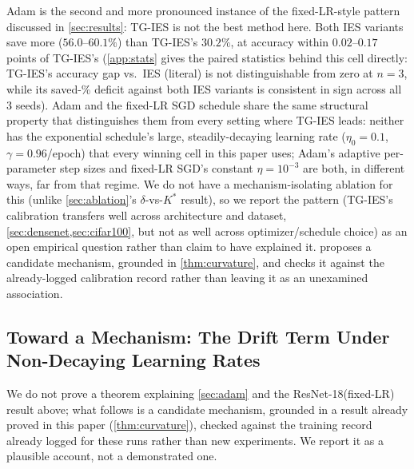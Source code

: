 \documentclass{article}
\theoremstyle{plain}
\theoremstyle{definition}
\theoremstyle{remark}
\begin{document}
Adam \citep{kingma2015adam} is the second and more pronounced instance of the fixed-LR-style pattern discussed in \cref{sec:results}: TG-IES is not the best method here. Both IES variants save more ($56.0$--$60.1\%$) than TG-IES's $30.2\%$, at accuracy within $0.02$--$0.17$ points of TG-IES's (\cref{app:stats} gives the paired statistics behind this cell directly: TG-IES's accuracy gap vs.\ IES (literal) is not distinguishable from zero at $n=3$, while its saved-\% deficit against both IES variants is consistent in sign across all 3 seeds). Adam and the fixed-LR SGD schedule share the same structural property that distinguishes them from every setting where TG-IES leads: neither has the exponential schedule's large, steadily-decaying learning rate ($\eta_0{=}0.1$, $\gamma{=}0.96$/epoch) that every winning cell in this paper uses; Adam's adaptive per-parameter step sizes and fixed-LR SGD's constant $\eta{=}10^{-3}$ are both, in different ways, far from that regime. We do not have a mechanism-isolating ablation for this (unlike \cref{sec:ablation}'s $\delta$-vs-$K^*$ result), so we report the pattern (TG-IES's calibration transfers well across architecture and dataset, \cref{sec:densenet,sec:cifar100}, but not as well across optimizer/schedule choice) as an open empirical question rather than claim to have explained it.  proposes a candidate mechanism, grounded in \cref{thm:curvature}, and checks it against the already-logged calibration record rather than leaving it as an unexamined association.

\subsection{Toward a Mechanism: The Drift Term Under Non-Decaying Learning Rates}
\label{sec:lrmechanism}

We do not prove a theorem explaining \cref{sec:adam} and the ResNet-18(fixed-LR) result above; what follows is a candidate mechanism, grounded in a result already proved in this paper (\cref{thm:curvature}), checked against the training record already logged for these runs rather than new experiments. We report it as a plausible account, not a demonstrated one.
\end{document}
